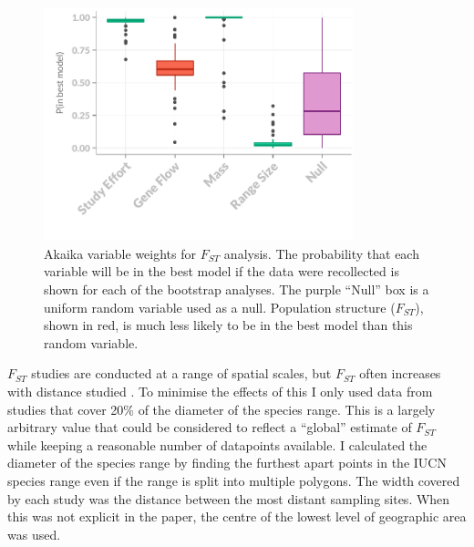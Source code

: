 \begin{knitrout}\footnotesize
{}\color{fgcolor}\begin{figure}[t]

{\centering \includegraphics[width=0.8\textwidth]{figure/fstITPlots-1} 

}

\caption[Akaika variable weights for $F_{ST}$ analysis.]{Akaika variable weights for $F_{ST}$ analysis. The probability that each variable will be in the best model if the data were recollected is shown for each of the bootstrap analyses. The purple ``Null'' box is a uniform random variable used as a null. Population structure ($F_{ST}$), shown in red, is much less likely to be in the best model than this random variable.}\label{fig:fstITPlots}
\end{figure}


\end{knitrout}
















$F_{ST}$ studies are conducted at a range of spatial scales, but $F_{ST}$ often increases with distance studied \cite{burland1999population, hulva2010mechanisms, o2015genetic, vonhof2015range}.
To minimise the effects of this I only used data from studies that cover 20\% of the diameter of the species range.
This is a largely arbitrary value that could be considered to reflect a ``global'' estimate of $F_{ST}$ while keeping a reasonable number of datapoints available.
I calculated the diameter of the species range by finding the furthest apart points in the IUCN species range \cite{iucn} even if the range is split into multiple polygons.
The width covered by each study was the distance between the most distant sampling sites.
When this was not explicit in the paper, the centre of the lowest level of geographic area was used.



